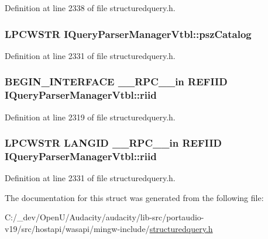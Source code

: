 Definition at line 2338 of file structuredquery.\+h.

\subsubsection[{\texorpdfstring{psz\+Catalog}{pszCatalog}}]{ {\bf L\+P\+C\+W\+S\+TR} I\+Query\+Parser\+Manager\+Vtbl\+::psz\+Catalog}\hypertarget{struct_i_query_parser_manager_vtbl_aca550c2fcdcaec315b5907cf0942fe94}{}\label{struct_i_query_parser_manager_vtbl_aca550c2fcdcaec315b5907cf0942fe94}


Definition at line 2331 of file structuredquery.\+h.

\subsubsection[{\texorpdfstring{riid}{riid}}]{\setlength{\rightskip}{0pt plus 5cm}B\+E\+G\+I\+N\+\_\+\+I\+N\+T\+E\+R\+F\+A\+CE {\bf \+\_\+\+\_\+\+R\+P\+C\+\_\+\+\_\+in} {\bf R\+E\+F\+I\+ID} I\+Query\+Parser\+Manager\+Vtbl\+::riid}\hypertarget{struct_i_query_parser_manager_vtbl_a6a9583156244a6c5ef4afdb4addb9041}{}\label{struct_i_query_parser_manager_vtbl_a6a9583156244a6c5ef4afdb4addb9041}


Definition at line 2319 of file structuredquery.\+h.

\subsubsection[{\texorpdfstring{riid}{riid}}]{ {\bf L\+P\+C\+W\+S\+TR} L\+A\+N\+G\+ID {\bf \+\_\+\+\_\+\+R\+P\+C\+\_\+\+\_\+in} {\bf R\+E\+F\+I\+ID} I\+Query\+Parser\+Manager\+Vtbl\+::riid}\hypertarget{struct_i_query_parser_manager_vtbl_a8fe409ae27aa94e54baada5c5f6c4130}{}\label{struct_i_query_parser_manager_vtbl_a8fe409ae27aa94e54baada5c5f6c4130}


Definition at line 2331 of file structuredquery.\+h.



The documentation for this struct was generated from the following file\+:\begin{DoxyCompactItemize}
\item 
C\+:/\+\_\+dev/\+Open\+U/\+Audacity/audacity/lib-\/src/portaudio-\/v19/src/hostapi/wasapi/mingw-\/include/\hyperlink{structuredquery_8h}{structuredquery.\+h}\end{DoxyCompactItemize}
